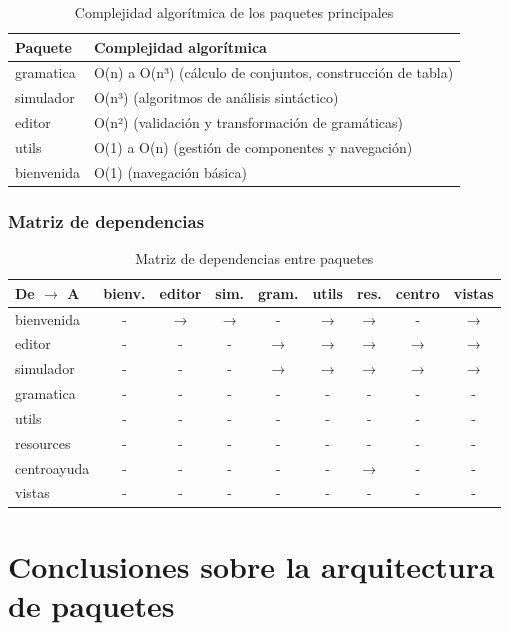 \begin{table}[H]
\centering
\caption{Complejidad algorítmica de los paquetes principales}
\label{tab:complejidad-paquetes}
\begin{tabular}{|l|l|}
\hline
\textbf{Paquete} & \textbf{Complejidad algorítmica} \\
\hline
gramatica & O(n) a O(n³) (cálculo de conjuntos, construcción de tabla) \\
simulador & O(n³) (algoritmos de análisis sintáctico) \\
editor & O(n²) (validación y transformación de gramáticas) \\
utils & O(1) a O(n) (gestión de componentes y navegación) \\
bienvenida & O(1) (navegación básica) \\
\hline
\end{tabular}
\end{table}

\subsubsection{Matriz de dependencias}

\begin{table}[H]
\centering
\caption{Matriz de dependencias entre paquetes}
\label{tab:matriz-dependencias}
\begin{tabular}{|l|c|c|c|c|c|c|c|c|}
\hline
\textbf{De $\rightarrow$ A} & bienv. & editor & sim. & gram. & utils & res. & centro & vistas \\
\hline
\hline
bienvenida & - & → & → & - & → & → & - & → \\
editor & - & - & - & → & → & → & → & → \\
simulador & - & - & - & → & → & → & → & → \\
gramatica & - & - & - & - & - & - & - & - \\
utils & - & - & - & - & - & - & - & - \\
resources & - & - & - & - & - & - & - & - \\
centroayuda & - & - & - & - & - & → & - & - \\
vistas & - & - & - & - & - & - & - & - \\
\hline
\end{tabular}
\end{table}

\section{Conclusiones sobre la arquitectura de paquetes}

